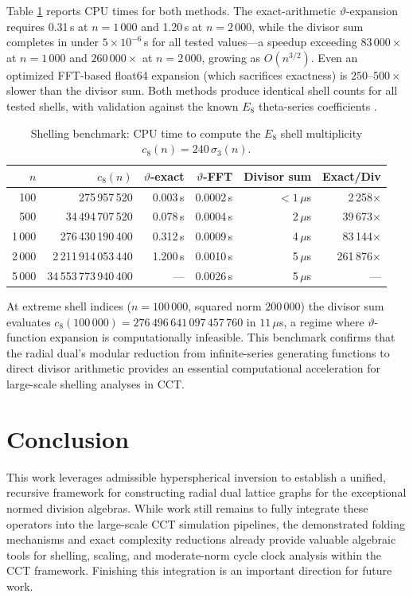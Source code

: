 \documentclass{article}
\begin{document}
Table \ref{tab:shelling-benchmark} reports CPU times for both methods. The exact-arithmetic $\vartheta$-expansion requires 0.31\,s at $n = 1\,000$ and 1.20\,s at $n = 2\,000$, while the divisor sum completes in under $5 \times 10^{-6}$\,s for all tested values---a speedup exceeding $83\,000\times$ at $n = 1\,000$ and $260\,000\times$ at $n = 2\,000$, growing as $O(n^{3/2})$. Even an optimized FFT-based float64 expansion (which sacrifices exactness) is $250$--$500\times$ slower than the divisor sum. Both methods produce identical shell counts for all tested shells, with validation against the known $E_8$ theta-series coefficients \cite{ConwaySloane1999}.

\begin{table}[htbp]
\centering
\caption{Shelling benchmark: CPU time to compute the $E_8$ shell multiplicity $c_8(n) = 240\,\sigma_3(n)$.}
\label{tab:shelling-benchmark}
\begin{tabular}{r|r|r|r|r|r}
$n$ & $c_8(n)$ & $\vartheta$-exact & $\vartheta$-FFT & Divisor sum & Exact/Div \\
\hline
   100 & 275\,957\,520 & 0.003\,s & 0.0002\,s & $<\!1\,\mu$s & 2\,258$\times$ \\
   500 & 34\,494\,707\,520 & 0.078\,s & 0.0004\,s & 2\,$\mu$s & 39\,673$\times$ \\
 1\,000 & 276\,430\,190\,400 & 0.312\,s & 0.0009\,s & 4\,$\mu$s & 83\,144$\times$ \\
 2\,000 & 2\,211\,914\,053\,440 & 1.200\,s & 0.0010\,s & 5\,$\mu$s & 261\,876$\times$ \\
 5\,000 & 34\,553\,773\,940\,400 & — & 0.0026\,s & 5\,$\mu$s & — \\
\end{tabular}
\end{table}

At extreme shell indices ($n = 100\,000$, squared norm $200\,000$) the divisor sum evaluates $c_8(100\,000) = 276\,496\,641\,097\,457\,760$ in $11\,\mu$s, a regime where $\vartheta$-function expansion is computationally infeasible. This benchmark confirms that the radial dual's modular reduction from infinite-series generating functions to direct divisor arithmetic provides an essential computational acceleration for large-scale shelling analyses in CCT.

\section{Conclusion}
\label{sec:conclusion}
This work leverages admissible hyperspherical inversion to establish a unified, recursive framework for constructing radial dual lattice graphs for the exceptional normed division algebras. While work still remains to fully integrate these operators into the large-scale CCT simulation pipelines, the demonstrated folding mechanisms and exact complexity reductions already provide valuable algebraic tools for shelling, scaling, and moderate-norm cycle clock analysis within the CCT framework. Finishing this integration is an important direction for future work.
\end{document}
